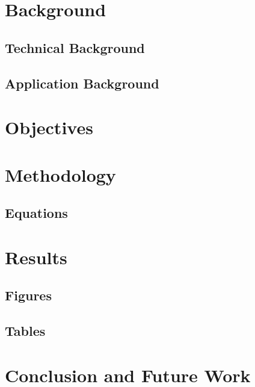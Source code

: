 \documentclass[12pt]{asu}
\begin{document}
	\chapter[Background]{\centering Background} \label{bkgrnd}
				\section{Technical Background}
				 \label{bkgrnd_technical}
				\section{Application Background}
				 \label{bkgrnd_application}

	\chapter[Objectives]{\centering Objectives} \label{objectives}
	 \label{objectives}

	\chapter[Methodology]{\centering Methodology} \label{methods}
	 \label{methods_intro}
		\section{Equations}
		 \label{methods_equations}

	\chapter[Results]{\centering Results} \label{results}
	 \label{results_intro}
		\section{Figures}
		 \label{results_figures}
		\section{Tables}
		 \label{results_tables}

	\chapter[Conclusion and Future Work]{\centering Conclusion and Future Work} \label{concl_futwork}
\end{document}
